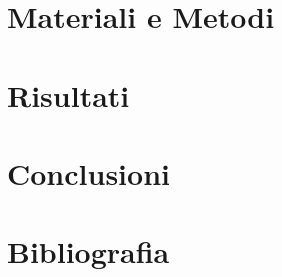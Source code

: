 \documentclass[
    italian,          %
    12pt,
    a4paper,
    twoside,
]{book}
\begin{document}
\chapter{Materiali e Metodi}
\startThumbs

\stopThumbs

\chapter{Risultati}
\startThumbs

\stopThumbs

\chapter{Conclusioni}
\startThumbs

\stopThumbs

\chapter*{Bibliografia}
\renewcommand*{\bibfont}{\fontsize{10}{12}\selectfont}     %
\printbibliography[heading=none]

\cleardoublepage
\end{document}
